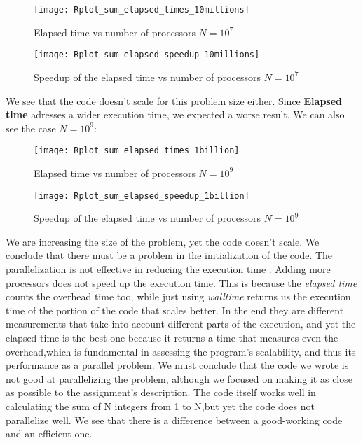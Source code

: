 \documentclass[11pt]{scrartcl} %
\begin{document}
\begin{figure}[H] %
	\centering
	\texttt{[image: Rplot\_sum\_elapsed\_times\_10millions]} %
	\caption{Elapsed time vs number of processors $N= 10^7$}
\end{figure}
\begin{figure}[H] %
	\centering
	\texttt{[image: Rplot\_sum\_elapsed\_speedup\_10millions]} %
	\caption{Speedup of the elapsed time vs number of processors $N= 10^7$}
\end{figure}
We see that the code doesn't scale for this problem size either.
Since \textbf{Elapsed time} adresses a wider execution time, we expected a worse result. We can also see the case $N=10^9$:
\begin{figure}[H] %
	\centering
	\texttt{[image: Rplot\_sum\_elapsed\_times\_1billion]} %
	\caption{Elapsed time vs number of processors $N= 10^9$}
\end{figure}
\begin{figure}[H] %
	\centering
	\texttt{[image: Rplot\_sum\_elapsed\_speedup\_1billion]} %
	\caption{Speedup of the elapsed time vs number of processors $N= 10^9$}
\end{figure}

We are increasing the size of the problem, yet the code doesn't scale. We conclude that there must be a problem in the initialization of the code. The parallelization is not effective in reducing the execution time . Adding more processors does not speed up the execution time.
This is because the \textit{elapsed time} counts the overhead time too, while just using \textit{walltime} returns us the execution time of the portion of the code that scales better. In the end they are different measurements that take into account different parts of the execution, and yet the elapsed time is the best one because it returns a time that measures even the overhead,which is fundamental in assessing the program's scalability, and thus its performance as a parallel problem.
We must conclude that the code we wrote is not good at parallelizing the problem, although we focused on making it as close as possible to the assignment's description. The code itself works well in calculating the sum of N integers from 1 to N,but yet the code does not parallelize well. We see that there is a difference between a good-working code and an efficient one. 
\end{document}
